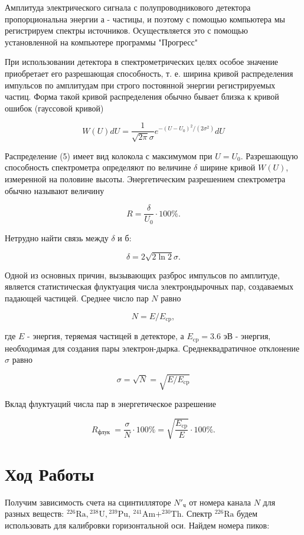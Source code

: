\documentclass[11.5pt,a4paper,russian]{article}
\begin{document}
Амплитуда электрического сигнала с полупроводникового детектора пропорциональна энергии а - частицы, и поэтому с помощью компьютера мы регистрируем спектры источников. Осуществляется это с помощью установленной на компьютере программы "Прогресс"

При использовании детектора в спектрометрических целях особое значение приобретает его разрешающая способность, т. е. ширина кривой распределения импульсов по амплитудам при строго постоянной энергии регистрируемых частиц. Форма такой кривой распределения обычно бывает близка к кривой ошибок (гауссовой кривой)

$$
W(U) d U=\frac{1}{\sqrt{2 \pi} \sigma} e^{-\left(U-U_0\right)^2 /\left(2 \sigma^2\right)} d U
$$

Распределение (5) имеет вид колокола с максимумом при $U=U_0$. Разрешающую способность спектрометра определяют по величине $\delta$ ширине кривой $W(U)$, измеренной на половине высоты. Энергетическим разрешением спектрометра обычно называют величину

$$
R=\frac{\delta}{U_0} \cdot 100 \% .
$$

Нетрудно найти связь между $\delta$ и б:

$$
\delta=2 \sqrt{2 \ln 2} \sigma .
$$

Одной из основных причин, вызывающих разброс импульсов по амплитуде, является статистическая флуктуация числа электрондырочных пар, создаваемых падающей частицей. Среднее число пар $N$ равно

$$
N=E / E_{\mathrm{cp}},
$$

где $E$ - энергия, теряемая частицей в детекторе, а $E_{\mathrm{cp}}=3.6$ эВ - энергия, необходимая для создания пары электрон-дырка. Среднеквадратичное отклонение $\sigma$ равно

$$
\sigma=\sqrt{N}=\sqrt{E / E_{\mathrm{cp}}}
$$

Вклад флуктуаций числа пар в энергетическое разрешение

$$
R_{\text {флук }}=\frac{\sigma}{N} \cdot 100 \%=\sqrt{\frac{E_{\mathrm{cp}}}{E}} \cdot 100 \% .
$$

\section{Ход Работы}
Получим зависимость счета на сцинтилляторе $N'_\text{ч}$ от номера канала $N$ для разных веществ: ${}^{226}\mathrm{Ra},{}^{238}\mathrm{U}, { }^{239} \mathrm{Pu}$, ${}^{241}\mathrm{Am} + ^{230} \mathrm{Th}$. Спектр ${ }^{226} \mathrm{Ra}$ будем использовать для калибровки горизонтальной оси. Найдем номера пиков:
\end{document}
